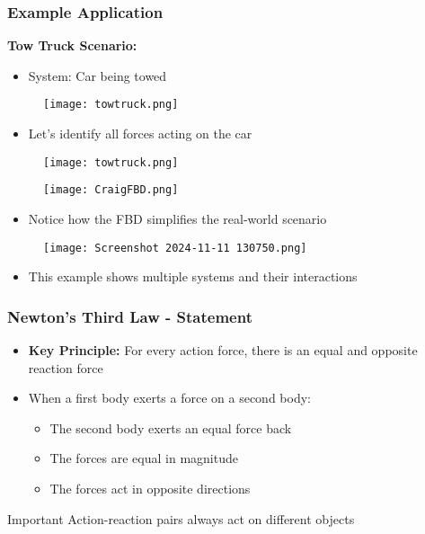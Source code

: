 \documentclass{beamer}
\begin{document}
\begin{frame}
\frametitle{Example Application}
\textbf{Tow Truck Scenario:}
\begin{itemize}
    \item System: Car being towed
\end{itemize}
\pause
\begin{figure}[H]
    \centering
    \texttt{[image: towtruck.png]}
\end{figure}
\pause
\begin{itemize}
    \item Let's identify all forces acting on the car
\end{itemize}
\end{frame}

\begin{frame}
\begin{figure}[H]
    \centering
    \texttt{[image: towtruck.png]}
\end{figure}
\pause
\begin{figure}[H]
    \centering
    \texttt{[image: CraigFBD.png]}
\end{figure}
\pause
\begin{itemize}
    \item Notice how the FBD simplifies the real-world scenario
\end{itemize}
\end{frame}


\begin{frame}
\begin{figure}
    \centering
    \texttt{[image: Screenshot 2024-11-11 130750.png]}
\end{figure}
\pause
\begin{itemize}
    \item This example shows multiple systems and their interactions
\end{itemize}
\end{frame}


\begin{frame}
\frametitle{Newton's Third Law - Statement}
\begin{itemize}
    \item \textbf{Key Principle:} For every action force, there is an equal and opposite reaction force
    \pause
    \item When a first body exerts a force on a second body:
    \pause
    \begin{itemize}
        \item The second body exerts an equal force back
        \item The forces are equal in magnitude
        \item The forces act in opposite directions
    \end{itemize}
\end{itemize}
\pause
\begin{alertblock}{Important}
    Action-reaction pairs always act on different objects
\end{alertblock}
\end{frame}
\end{document}
